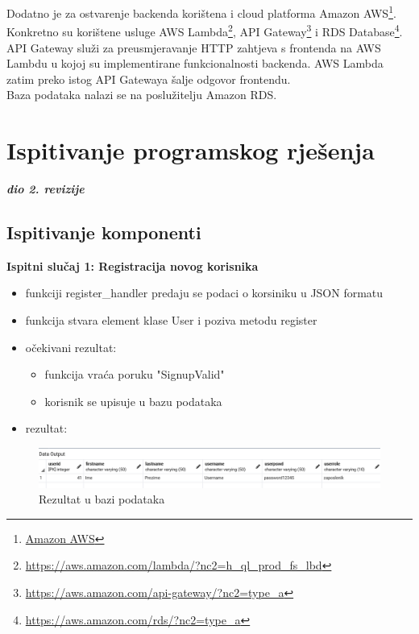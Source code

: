 			Dodatno je za ostvarenje backenda korištena i cloud platforma Amazon AWS\footnote{\href{https://aws.amazon.com}{Amazon AWS}}. Konkretno su korištene usluge AWS Lambda\footnote{\href{https://aws.amazon.com/lambda/?nc2=h\_ql\_prod\_fs\_lbd}{https://aws.amazon.com/lambda/?nc2=h\_ql\_prod\_fs\_lbd}}, API Gateway\footnote{\href{https://aws.amazon.com/api-gateway/?nc2=type\_a}{https://aws.amazon.com/api-gateway/?nc2=type\_a}} i RDS Database\footnote{\href{https://aws.amazon.com/rds/?nc2=type\_a}{https://aws.amazon.com/rds/?nc2=type\_a}}. API Gateway služi za preusmjeravanje HTTP zahtjeva s frontenda na AWS Lambdu u kojoj su implementirane funkcionalnosti backenda. AWS Lambda zatim preko istog API Gatewaya šalje odgovor frontendu. \\
			
			Baza podataka nalazi se na poslužitelju Amazon RDS.
			
			\eject 
		
	
		\section{Ispitivanje programskog rješenja}
			
			\textbf{\textit{dio 2. revizije}}\\
			
			
	
			
			\subsection{Ispitivanje komponenti}
			
			\textbf{Ispitni slučaj 1: Registracija novog korisnika}\\
			\begin{itemize}
				\item funkciji register\_handler predaju se podaci o korsiniku u JSON formatu
				\item funkcija stvara element klase User i poziva metodu register
			
			\item očekivani rezultat:\\
				\begin{itemize}
					\item funkcija vraća poruku "SignupValid" 
					\item korisnik se upisuje u bazu podataka
				\end{itemize}
			\item rezultat:
		\end{itemize}
			\begin{figure}[H]
				\includegraphics[scale=0.5]{./slike/baza1.png}
				\caption{Rezultat u bazi podataka}
				\label{fig:REZ1}
			\end{figure}

